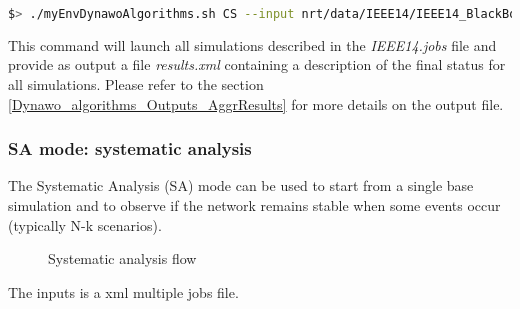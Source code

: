 \documentclass[a4paper, 12pt]{report}
\begin{document}
\begin{lstlisting}[language=bash, breaklines=true, breakatwhitespace=false]
$> ./myEnvDynawoAlgorithms.sh CS --input nrt/data/IEEE14/IEEE14_BlackBoxModels/IEEE14.jobs --output results.xml
\end{lstlisting}

This command will launch all simulations described in the \textit{IEEE14.jobs} file 
and provide as output a file \textit{results.xml} containing a description of the final status for all simulations. 
Please refer to the section \ref{Dynawo_algorithms_Outputs_AggrResults} for more details on the output file.

\subsubsection{SA mode: systematic analysis}

The Systematic Analysis (SA) mode can be used to start from a single base simulation and to observe 
if the network remains stable when some events occur (typically N-k scenarios).\\

\begin{center}
\begin{figure}[H]
\caption{Systematic analysis flow}
\end{figure}
\end{center}

The inputs is a xml multiple jobs file.
\end{document}

